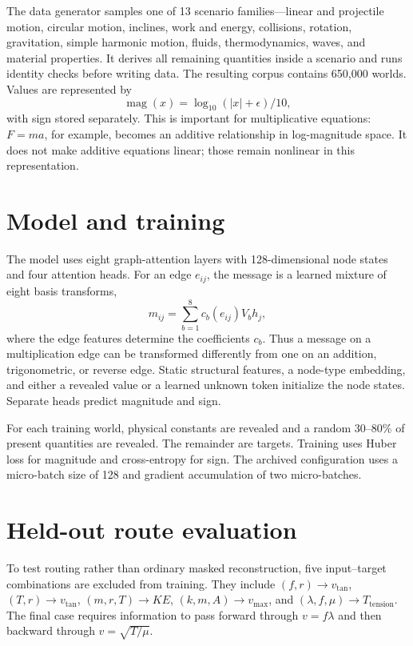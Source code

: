 \documentclass[11pt]{article}
\begin{document}
The data generator samples one of 13 scenario families---linear and projectile motion, circular motion, inclines, work and energy, collisions, rotation, gravitation, simple harmonic motion, fluids, thermodynamics, waves, and material properties. It derives all remaining quantities inside a scenario and runs identity checks before writing data. The resulting corpus contains 650,000 worlds. Values are represented by
\[
  \operatorname{mag}(x)=\log_{10}(|x|+\epsilon)/10,
\]
with sign stored separately. This is important for multiplicative equations: $F=ma$, for example, becomes an additive relationship in log-magnitude space. It does not make additive equations linear; those remain nonlinear in this representation.

\section{Model and training}

The model uses eight graph-attention layers with 128-dimensional node states and four attention heads. For an edge $e_{ij}$, the message is a learned mixture of eight basis transforms,
\[
 m_{ij}=\sum_{b=1}^{8}c_b(e_{ij})V_bh_j,
\]
where the edge features determine the coefficients $c_b$. Thus a message on a multiplication edge can be transformed differently from one on an addition, trigonometric, or reverse edge. Static structural features, a node-type embedding, and either a revealed value or a learned unknown token initialize the node states. Separate heads predict magnitude and sign.

For each training world, physical constants are revealed and a random 30--80\% of present quantities are revealed. The remainder are targets. Training uses Huber loss for magnitude and cross-entropy for sign. The archived configuration uses a micro-batch size of 128 and gradient accumulation of two micro-batches.

\section{Held-out route evaluation}

To test routing rather than ordinary masked reconstruction, five input--target combinations are excluded from training. They include $(f,r)\rightarrow v_{\tan}$, $(T,r)\rightarrow v_{\tan}$, $(m,r,T)\rightarrow KE$, $(k,m,A)\rightarrow v_{\max}$, and $(\lambda,f,\mu)\rightarrow T_{\mathrm{tension}}$. The final case requires information to pass forward through $v=f\lambda$ and then backward through $v=\sqrt{T/\mu}$.
\end{document}
